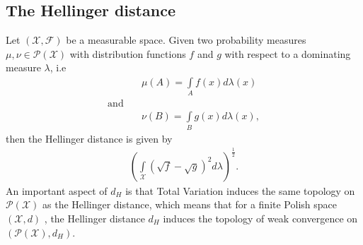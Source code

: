 \documentclass[11pt,a4paper]{article}
\begin{document}
\subsection*{The Hellinger distance}
Let $(\mathcal{X,F})$ be a measurable space. Given two probability measures $\mu,\nu\in\mathcal{P(X)}$ with distribution functions $f$ and $g$ with respect to a dominating measure $\lambda$, i.e 
\begin{align*}
&\quad\mu(A) = \int\limits_{A}f(x)d\lambda(x) \\\text{and}&\\&\quad\nu(B) = \int\limits_{B}g(x)d\lambda(x),
\end{align*}
then the Hellinger distance is given by 
\begin{align*}
\left(\int\limits_{\mathcal{X}}\left(\sqrt{f}-\sqrt{g}\right)^2d\lambda\right)^{\frac{1}{2}}.
\end{align*}
An important aspect of $d_H$ is that Total Variation induces the same topology on $\mathcal{P(X)}$ as the Hellinger distance, which means that for a finite Polish space $(\mathcal{X},d)$ , the Hellinger distance $d_H$ induces the topology of weak convergence on $(\mathcal{P(X)},d_H).$\vspace{2em}\\
\newpage
\end{document}
